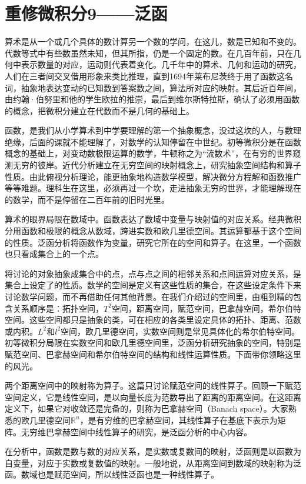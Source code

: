 \section{重修微积分9——泛函}

算术是从一个或几个具体的数计算另一个数的学问，在这儿，数是已知和不变的。代数等式中有些数虽然未知，但其所指，仍是一个固定的数。在几百年前，只在几何中表示数量的对应，运动则代表着变化。几千年中的算术、几何和运动的研究，人们在三者间交叉借用形象来类比推理，直到1694年莱布尼茨终于用了函数这名词，抽象地表达变动的已知数到答案数之间，算法所对应的映射。其后近百年间，由约翰·伯努里和他的学生欧拉的推崇，最后到维尔斯特拉斯，确认了必须用函数的概念，把微积分建立在代数而不是几何的基础上。

函数，是我们从小学算术到中学要理解的第一个抽象概念，没过这坎的人，与数理绝缘，后面的课就不能理解了，对数学的认知停留在中世纪。初等微积分是在函数概念的基础上，对变动数极限运算的数学，牛顿称之为“流数术”，在有穷的世界窥测无穷的彼岸。近代分析建立在无穷空间的映射概念上，研究抽象空间结构和算子性质。由此俯视分析理论，能更抽象地构造数学模型，解决微分方程解和函数推广等等难题。理科生在这里，必须再过一个坎，走进抽象无穷的世界，才能理解现在的数学，而不是停留在二百年前的旧时光里。

算术的眼界局限在数域中。函数表达了数域中变量与映射值的对应关系。经典微积分用函数和极限的概念从数域，跨进实数和欧几里德空间。其运算都基于这个空间的性质。泛函分析将函数作为变量，研究它所在的空间和算子。在这里，一个函数也只看成集合上的一个点。

将讨论的对象抽象成集合中的点，点与点之间的相邻关系和点间运算对应关系，是集合上设定了的性质。数学的空间是定义有这些性质的集合，在这些设定条件下来讨论数学问题，而不再借助任何其他背景。在我们介绍过的空间里，由粗到精的包含关系顺序是：拓扑空间，$ T^2 $空间，距离空间，赋范空间，巴拿赫空间，希尔伯特空间。这些空间都只是抽象的类，可在相应的各类里设定具体的拓扑、距离、范数或内积。$ L^2 $和$ l^2 $空间，欧几里德空间，实数空间则是常见具体化的希尔伯特空间。初等微积分局限在实数空间和欧几里德空间里，泛函分析研究抽象的空间，特别是赋范空间、巴拿赫空间和希尔伯特空间的结构和线性运算性质。下面带你领略这里的风光。

两个距离空间中的映射称为算子。这篇只讨论赋范空间的线性算子。回顾一下赋范空间定义，它是线性空间，是以向量长度为范数导出了距离的距离空间。在这距离定义下，如果它对收敛还是完备的，则称为巴拿赫空间（Banach space）。大家熟悉的欧几里德空间$\mathbb{R}^n$，是有穷维的巴拿赫空间，其线性算子在基底下表示为矩阵。无穷维巴拿赫空间中线性算子的研究，是泛函分析的中心内容。

在分析中，函数是数与数的对应关系，是实数或复数间的映射，泛函则是以函数为自变量，对应于实数或复数值的映射。一般地说，从距离空间到数域的映射称为泛函。数域也是赋范空间，所以线性泛函也是一种线性算子。

